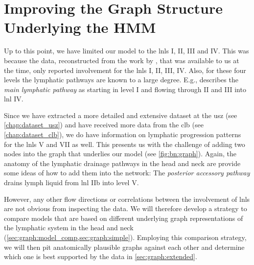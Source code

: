\documentclass[\relativeRoot/main.tex]{subfiles}
\begin{document}
\chapter{Improving the Graph Structure Underlying the HMM}
\label{chap:graph}
\globalreset

Up to this point, we have limited our model to the \glspl{lnl} I, II, III and IV. This was because the data, reconstructed from the work by , that was available to us at the time, only reported involvement for the \glspl{lnl} I, II, III, IV. Also, for these four levels the lymphatic pathways are known to a large degree. E.g.,  describes the \emph{main lymphatic pathway} as starting in level I and flowing through II and III into \gls{lnl} IV.

Since we have extracted a more detailed and extensive dataset at the \gls{usz} (see \cref{chap:dataset_usz}) and have received more data from the \gls{clb} (see \cref{chap:dataset_clb}), we do have information on lymphatic progression patterns for the \glspl{lnl} V and VII as well. This presents us with the challenge of adding two nodes into the graph that underlies our model (see \cref{fig:bn:graph}). Again, the anatomy of the lymphatic drainage pathways in the head and neck are provide some ideas of how to add them into the network: The \emph{posterior accessory pathway} drains lymph liquid from \gls{lnl} IIb into level V.

However, any other flow directions or correlations between the involvement of \glspl{lnl} are not obvious from inspecting the data. We will therefore develop a strategy to compare models that are based on different underlying graph representations of the lymphatic system in the head and neck (\cref{sec:graph:model_comp,sec:graph:simple}). Employing this comparison strategy, we will then pit anatomically plausible graphs against each other and determine which one is best supported by the data in \cref{sec:graph:extended}.




\end{document}
